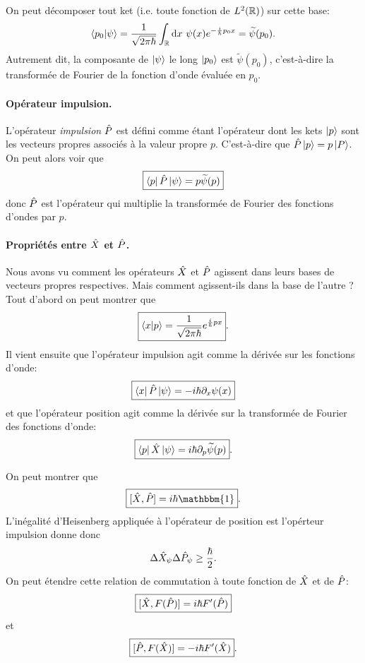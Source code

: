 \documentclass[11pt,a4paper,oneside]{article}
\begin{document}
On peut décomposer tout ket (i.e. toute fonction de $L^2(\mathbb{R})$) sur cette base:
\begin{equation}
    \braket{p_0}{\psi} = \frac{1}{\sqrt{2\pi\hbar}}\int_{\mathbb{R}}\text{d} x~\psi(x)e^{-\frac{i}{\hbar}p_0x} = \widetilde{\psi}(p_0).
\end{equation}
Autrement dit, la composante de $\ket{\psi}$ le long $\ket{p_0}$ est $\widetilde{\psi}(p_0)$, c'est-à-dire la transformée de Fourier de la fonction d'onde évaluée en $p_0$.

\paragraph{Opérateur impulsion.} L'opérateur \emph{impulsion} $\hat{P}$ est défini comme étant l'opérateur dont les kets $\ket{p}$ sont les vecteurs propres associés à la valeur propre $p$. C'est-à-dire que $\hat{P}\ket{p}=p\ket{P}$. On peut alors voir que
\begin{equation}
    \boxed{\bra{p}\hat{P}\ket{\psi}=p\widetilde{\psi}(p)}
\end{equation}
donc $\hat{P}$ est l'opérateur qui multiplie la transformée de Fourier des fonctions d'ondes par $p$.

\paragraph{Propriétés entre $\hat{X}$ et $\hat{P}$.} Nous avons vu comment les opérateurs $\hat{X}$ et $\hat{P}$ agissent dans leurs bases de vecteurs propres respectives. Mais comment agissent-ils dans la base de l'autre ? Tout d'abord on peut montrer que
\begin{equation}
    \boxed{\braket{x}{p}=\frac{1}{\sqrt{2\pi\hbar}}e^{\frac{i}{\hbar}px}}.
\end{equation}
Il vient ensuite que l'opérateur impulsion agit comme la dérivée sur les fonctions d'onde:
\begin{equation}
    \boxed{\bra{x}\hat{P}\ket{\psi} = -i\hbar\partial_x\psi(x)}
\end{equation}
et que l'opérateur position agit comme la dérivée sur la transformée de Fourier des fonctions d'onde:
\begin{equation}
    \boxed{\bra{p}\hat{X}\ket{\psi} = i\hbar\partial_p\widetilde{\psi}(p)}.
\end{equation}

On peut montrer que
\begin{equation}
    \boxed{[\hX,\hP] = i\hbar\mathbbm{1}}.
\end{equation}
L'inégalité d'Heisenberg appliquée à l'opérateur de position est l'opérteur impulsion donne donc
\begin{equation}
    \Delta\hat{X}_\psi\Delta\hat{P}_\psi\geq\frac{\hbar}{2}.
\end{equation}
On peut étendre cette relation de commutation à toute fonction de $\hat{X}$ et de $\hat{P}$:
\begin{equation}
    \boxed{[\hat{X},F(\hat{P})] = i\hbar F'(\hat{P})}
\end{equation}
et
\begin{equation}
    \boxed{[\hat{P},F(\hat{X})] = -i\hbar F'(\hat{X})}.
\end{equation}
\end{document}
